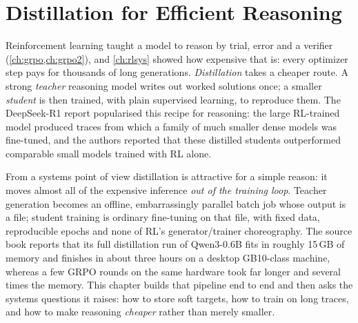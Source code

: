 \chapter{Distillation for Efficient Reasoning}\label{ch:distill}

Reinforcement learning taught a model to reason by trial, error and a verifier
(\cref{ch:grpo,ch:grpo2}), and \cref{ch:rlsys} showed how expensive that is: every optimizer
step pays for thousands of long generations. \emph{Distillation} takes a cheaper route. A
strong \emph{teacher} reasoning model writes out worked solutions once; a smaller
\emph{student} is then trained, with plain supervised learning, to reproduce them. The
DeepSeek-R1 report popularised this recipe for reasoning: the large RL-trained model produced
traces from which a family of much smaller dense models was fine-tuned, and the authors
reported that these distilled students outperformed comparable small models trained with RL
alone.

From a systems point of view distillation is attractive for a simple reason: it moves almost
all of the expensive inference \emph{out of the training loop}. Teacher generation becomes an
offline, embarrassingly parallel batch job whose output is a file; student training is ordinary
fine-tuning on that file, with fixed data, reproducible epochs and none of RL's
generator/trainer choreography. The source book reports that its full distillation run of
Qwen3-0.6B fits in roughly 15\,GB of memory and finishes in about three hours on a desktop
GB10-class machine, whereas a few GRPO rounds on the same hardware took far longer and several
times the memory. This chapter builds that pipeline end to end and then asks the systems
questions it raises: how to store soft targets, how to train on long traces, and how to make
reasoning \emph{cheaper} rather than merely smaller.

